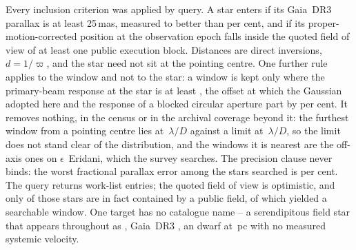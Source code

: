 Every inclusion criterion was applied by query. A star enters
if its Gaia~DR3 parallax is at least 25\,mas, measured to better than
\PlxAdqlPct{} per cent, and if its proper-motion-corrected position at the
observation epoch falls inside the quoted field of view of at least one
public execution block. Distances are direct inversions, $d=1/\varpi$, and
the star need not sit at the pointing centre. One further rule applies to the
window and not to the star: a window is kept only where the primary-beam
response at the star is at least \BmFloorResp, the offset at which the
Gaussian adopted here and the response of a blocked circular aperture
part by \BmFloorTolPct{} per cent. It removes nothing, in the census or in
the archival coverage beyond it: the furthest window from a pointing centre
lies at \ExCWorstExt\,$\lambda/D$ against a limit at
\BmFloorC\,$\lambda/D$, so the limit does not stand clear of the
distribution, and the windows it is nearest are the off-axis ones on
$\epsilon$~Eridani, which the survey searches.
The precision clause never binds: the worst fractional parallax
error among the stars searched is \SfPlxWorstPct{} per cent. The query returns
\NCensus{} work-list entries; the quoted field of view is optimistic, and
only \NGenuinelyCovered{} of those stars are in fact contained by a public
field, of which \NStars{} yielded a searchable window. One target has no
catalogue name -- a serendipitous field star that appears throughout as
\BkAlmaName, Gaia~DR3 \BkAlmaGaia, an \BkAlmaSpType{} dwarf at
\BkAlmaDistPc\,pc with no measured systemic velocity.

